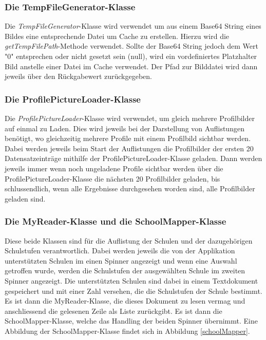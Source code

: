 \documentclass[../main.tex]{subfiles}
\begin{document}
	\subsubsection{Die TempFileGenerator-Klasse}
	Die \emph{TempFileGenerator}-Klasse wird verwendet um aus einem Base64 String eines Bildes eine entsprechende Datei um Cache zu erstellen. Hierzu wird die \emph{getTempFilePath}-Methode verwendet. Sollte der Base64 String jedoch dem Wert "0" entsprechen oder nicht gesetzt sein (null), wird ein vordefiniertes Platzhalter Bild anstelle einer Datei im Cache verwendet. Der Pfad zur Bilddatei wird dann jeweils über den Rückgabewert zurückgegeben.
	
	\subsubsection{Die ProfilePictureLoader-Klasse}
	Die \emph{ProfilePictureLoader}-Klasse wird verwendet, um gleich mehrere Profilbilder auf einmal zu Laden. Dies wird jeweils bei der Darstellung von Auflistungen benötigt, wo gleichzeitig mehrere Profile mit einem Profilbild sichtbar werden. Dabei werden jeweils beim Start der Auflistungen die Profilbilder der ersten 20 Datensatzeinträge mithilfe der ProfilePictureLoader-Klasse geladen. Dann werden jeweils immer wenn noch ungeladene Profile sichtbar werden über die ProfilePictureLoader-Klasse die nächsten 20 Profilbilder geladen, bis schlussendlich, wenn alle Ergebnisse durchgesehen worden sind, alle Profilbilder geladen sind.
	
	\subsubsection{Die MyReader-Klasse und die SchoolMapper-Klasse}
	Diese beide Klassen sind für die Auflistung der Schulen und der dazugehörigen Schulstufen verantwortlich. Dabei werden jeweils die von der Applikation unterstützten Schulen im einen Spinner angezeigt und wenn eine Auswahl getroffen wurde, werden die Schulstufen der ausgewählten Schule im zweiten Spinner angezeigt. Die unterstützten Schulen sind dabei in einem Textdokument gespeichert und mit einer Zahl versehen, die die Schulstufen der Schule bestimmt. Es ist dann die MyReader-Klasse, die dieses Dokument zu lesen vermag und anschliessend die gelesenen Zeile als Liste zurückgibt. Es ist dann die SchoolMapper-Klasse, welche das Handling der beiden Spinner übernimmt. Eine Abbildung der SchoolMapper-Klasse findet sich in Abbildung \ref{schoolMapper}.
	
\end{document}

